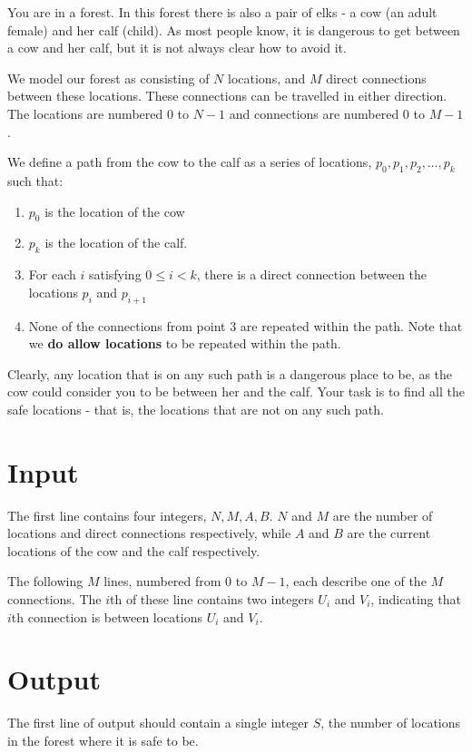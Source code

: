 \noindent
You are in a forest. In this forest there is also a pair of elks 
- a cow (an adult female) and her calf (child). As most 
people know, it is dangerous to get between a cow and her calf, but it is not always clear how to avoid it.

We model our forest as consisting of $N$ locations, and $M$ direct connections 
between these locations. These connections can be travelled in either direction. 
The locations are numbered $0$ to $N-1$ and connections are numbered $0$ to $M-1$.

We define a path from the cow to the calf as a series of locations, $p_0, p_1, p_2, \ldots , p_k$ such that:
\begin{enumerate}
  \item $p_0$ is the location of the cow
  \item $p_k$ is the location of the calf.
  \item For each $i$ satisfying $0 \le i < k$, there is a direct connection between the locations $p_i$ and $p_{i+1}$
  \item None of the connections from point 3 are repeated within the path. Note that we \textbf{do allow locations} to be repeated within the path.
\end{enumerate}

Clearly, any location that is on any such path is a dangerous place to be, 
as the cow could consider you to be between her and the calf. Your task is to find all the safe locations - that is, the locations that are not on any such path.


\section*{Input}
The first line contains four integers, $N, M, A, B$. $N$ and $M$ are the 
number of locations and direct connections respectively, while $A$ and $B$ are the current locations of the cow and the calf respectively.

The following $M$ lines, numbered from $0$ to $M-1$, each describe one of the $M$ connections. 
The $i$th of these line contains two integers $U_i$ and $V_i$, indicating that $i$th connection is between locations $U_i$ and $V_i$.

\section*{Output}
The first line of output should contain a single integer $S$, the number of locations in the forest where it is safe to be.

